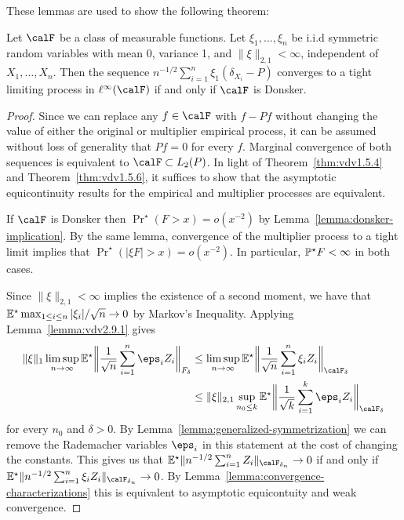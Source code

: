 These lemmas are used to show the following theorem: 
\begin{theorem}
	\label{thm:unconditional-multiplier-clt}
	Let \(\calF\) be a class of measurable functions. Let \(\xi_1,\dots,\xi_n\) be i.i.d symmetric random variables with mean 0, variance 1, and \(\|\xi\|_{2,1} < \infty\), independent of \(X_1,\dots,X_n\). Then the sequence \(n^{-1/2}\sum_{i=1}^n \xi_1(\delta_{X_i}-P)\) converges to a tight limiting process in \(\ell^\infty(\calF)\) if and only if \(\calF\) is Donsker.
\end{theorem}
\begin{proof}
	Since we can replace any \(f\in\calF\) with \(f-Pf\) without changing the value of either the original or multiplier empirical process, it can be assumed without loss of generality that \(Pf=0\) for every \(f\). Marginal convergence of both sequences is equivalent to \(\calF\subset L_2(P)\). In light of Theorem~\ref{thm:vdv1.5.4} and Theorem~\ref{thm:vdv1.5.6}, it suffices to show that the asymptotic equicontinuity results for the empirical and multiplier processes are equivalent.

	If \(\calF\) is Donsker then \(\Pr^\star\left(F>x\right)=o(x^{-2})\) by Lemma~\ref{lemma:donsker-implication}. By the same lemma, convergence of the multiplier process to a tight limit implies that \(\Pr^\star\left(|\xi F|>x\right)=o(x^{-2})\). In particular, \(\P^\star F <\infty\) in both cases. 

	Since \(\|\xi\|_{2,1}<\infty\) implies the existence of a second moment, we have that \(\E^\star\max_{1\leq i\leq n}|\xi_i|/\sqrt{n}\to 0\) by Markov's Inequality. Applying Lemma~\ref{lemma:vdv2.9.1} gives
	\begin{align*}
	   \|\xi\|_1\limsup_{n\to\infty}\E^\star\bigg\|\frac{1}{\sqrt{n}}\sum_{i=1}^n \eps_iZ_i\bigg\|_{F_\delta} 	
	   &\leq \limsup_{n\to\infty}\E^\star\bigg\|\frac{1}{\sqrt{n}}\sum_{i=1}^n \xi_iZ_i\bigg\|_{\calF_\delta} \\
	   &\leq \|\xi\|_{2,1}\sup_{n_0\leq k}\E^\star\bigg\|\frac{1}{\sqrt{k}}\sum_{i=1}^k\eps_iZ_i\bigg\|_{\calF_\delta}
	\end{align*}
	for every \(n_0\) and \(\delta > 0\). By Lemma~\ref{lemma:generalized-symmetrization} we can remove the Rademacher variables \(\eps_i\) in this statement at the cost of changing the constants. This gives us that \(\E^\star\|n^{-1/2}\sum_{i=1}^n Z_i\|_{\calF_{\delta_n}}\to 0\) if and only if \(\E^\star\|n^{-1/2}\sum_{i=1}^n \xi_iZ_i\|_{\calF_{\delta_n}}\to 0\). By Lemma~\ref{lemma:convergence-characterizations} this is equivalent to asymptotic equicontuity and weak convergence.
\end{proof}
